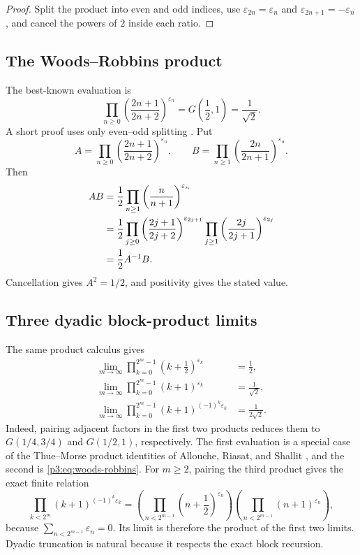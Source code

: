 \documentclass[11pt,oneside]{article}
\theoremstyle{definition}
\theoremstyle{remark}
\newcommand{\eps}{\varepsilon}
\begin{document}
\begin{proof}
Split the product into even and odd indices, use
$\eps_{2n}=\eps_n$ and $\eps_{2n+1}=-\eps_n$, and cancel the powers of $2$
inside each ratio.
\end{proof}

\subsection{The Woods--Robbins product}

The best-known evaluation is
\begin{equation}\label{p3:eq:woods-robbins}
 \boxed{\qquad
 \prod_{n\ge0}
 \left(\frac{2n+1}{2n+2}\right)^{\eps_n}
 =G\!\left(\frac12,1\right)=\frac1{\sqrt2}.
 \qquad}
\end{equation}
A short proof uses only even--odd splitting \cite{p3:woods1978,p3:robbins1979}.
Put
\begin{equation}\label{p3:eq:A-B-products}
 A=\prod_{n\ge0}\left(\frac{2n+1}{2n+2}\right)^{\eps_n},
 \qquad
 B=\prod_{n\ge1}\left(\frac{2n}{2n+1}\right)^{\eps_n}.
\end{equation}
Then
\begin{align}
 AB
 &=\frac12\prod_{n\ge1}
   \left(\frac n{n+1}\right)^{\eps_n}\notag\\
 &=\frac12
   \prod_{j\ge0}\left(\frac{2j+1}{2j+2}\right)^{\eps_{2j+1}}
   \prod_{j\ge1}\left(\frac{2j}{2j+1}\right)^{\eps_{2j}}\notag\\
 &=\frac12A^{-1}B.
\end{align}
Cancellation gives $A^2=1/2$, and positivity gives the stated value.

\subsection{Three dyadic block-product limits}

The same product calculus gives
\begin{align}
 \lim_{m\to\infty}
 \prod_{k=0}^{2^m-1}\left(k+\frac12\right)^{\eps_k}
 &=\frac12,\label{p3:eq:block-product-1}\\
 \lim_{m\to\infty}
 \prod_{k=0}^{2^m-1}(k+1)^{\eps_k}
 &=\frac1{\sqrt2},\label{p3:eq:block-product-2}\\
 \lim_{m\to\infty}
 \prod_{k=0}^{2^m-1}(k+1)^{(-1)^k\eps_k}
 &=\frac1{2\sqrt2}.
 \label{p3:eq:block-product-3}
\end{align}
Indeed, pairing adjacent factors in the first two products reduces them to
$G(1/4,3/4)$ and $G(1/2,1)$, respectively.  The first evaluation is a special
case of the Thue--Morse product identities of Allouche, Riasat, and Shallit
\cite{p3:alloucheriasatshallit2019}, and the second is
\cref{p3:eq:woods-robbins}.  For $m\ge2$, pairing the third product gives the
exact finite relation
\[
 \prod_{k<2^m}(k+1)^{(-1)^k\eps_k}
 =\left(\prod_{n<2^{m-1}}\left(n+\frac12\right)^{\eps_n}\right)
  \left(\prod_{n<2^{m-1}}(n+1)^{\eps_n}\right),
\]
because $\sum_{n<2^{m-1}}\eps_n=0$.  Its limit is therefore the product of
the first two limits.  Dyadic truncation is natural because it respects the
exact block recursion.
\end{document}
